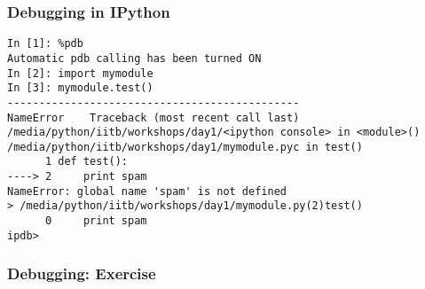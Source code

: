 \documentclass[14pt,compress]{beamer}
\begin{document}
\begin{frame}[fragile]
\frametitle{Debugging in IPython}
\small
\begin{lstlisting}
In [1]: %pdb
Automatic pdb calling has been turned ON
In [2]: import mymodule
In [3]: mymodule.test()
----------------------------------------------
NameError    Traceback (most recent call last)
/media/python/iitb/workshops/day1/<ipython console> in <module>()
/media/python/iitb/workshops/day1/mymodule.pyc in test()
      1 def test():
----> 2     print spam
NameError: global name 'spam' is not defined
> /media/python/iitb/workshops/day1/mymodule.py(2)test()
      0     print spam
ipdb>
\end{lstlisting}
\end{frame}

\begin{frame}[fragile]
\frametitle{Debugging: Exercise}
\end{frame}
\end{document}
